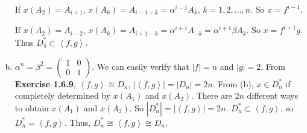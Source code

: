 \begin{answer}
\begin{enumerate}[(a)]
        If $x(A_{2})=A_{i+1}$, $x(A_{k})=A_{i-1+k}=\alpha^{i-1}A_{k}$, $k=1,2,\dots,n$. So $x=f^{i-1}$.

        If $x(A_{2})=A_{i-2}$, $x(A_{k})=A_{i+1-k}=\alpha^{i+1}A_{-k}=\alpha^{i+1}\beta A_{k}$. So $x=f^{i+1}g$. Thus $D_{4}^{*}\subset\left\langle f,g\right\rangle$.
        \item $\alpha^{n}=\beta^{2}=\begin{pmatrix}
            1&0\\0&1
        \end{pmatrix}$. We can easily verify that $\left| f \right| =n$ and $\left| g \right| =2$. From \textbf{Exercise 1.6.9}, $\left\langle f,g\right\rangle\cong D_{n}$, $\left| \left\langle f,g\right\rangle \right| =\left| D_{n} \right| =2n$. From (b), $x\in D_{n}^{*}$ if completely determined by $x(A_{1})$ and $x(A_{2})$. There are $2n$ different ways to obtain $x(A_{1})$ and $x(A_{2})$. So $\left| D_{n}^{*} \right| =\left| \left\langle f,g\right\rangle \right| =2n$. $D_{n}^{*}\subset \left\langle f,g\right\rangle$, so $D_{n}^{*}=\left\langle f,g\right\rangle$. Thus, $D_{n}^{*}\cong \left\langle f,g\right\rangle\cong D_{n}$.
    \end{enumerate}
\end{answer}